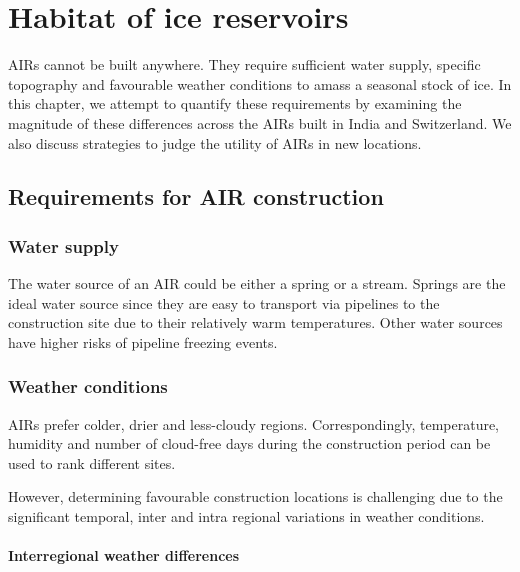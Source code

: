 \chapter{Habitat of ice reservoirs}

AIRs cannot be built anywhere. They require sufficient water supply, specific topography and favourable weather
conditions to amass a seasonal stock of ice. In this chapter, we attempt to quantify these requirements by
examining the magnitude of these differences across the AIRs built in India and Switzerland. We also discuss
strategies to judge the utility of AIRs in new locations.

\section{Requirements for AIR construction}

\subsection{Water supply}

The water source of an AIR could be either a spring or a stream. Springs are the ideal water source since they
are easy to transport via pipelines to the construction site due to their relatively warm temperatures. Other
water sources have higher risks of pipeline freezing events.

\subsection{Weather conditions}

AIRs prefer colder, drier and less-cloudy regions. Correspondingly, temperature, humidity and number of
cloud-free days during the construction period can be used to rank different sites. 

However, determining favourable construction locations is challenging due to the significant temporal, inter and
intra regional variations in weather conditions.

\subsubsection{Interregional weather differences}

